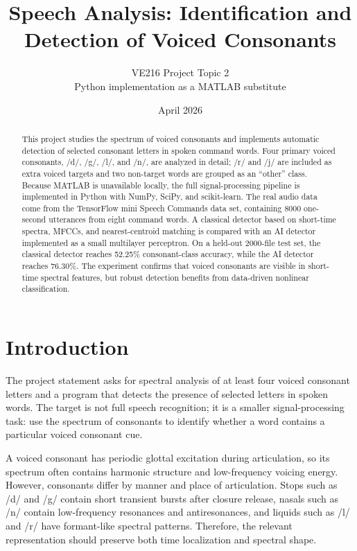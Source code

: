 \documentclass[11pt]{article}
\title{Speech Analysis: Identification and Detection of Voiced Consonants}
\author{VE216 Project Topic 2\\Python implementation as a MATLAB substitute}
\date{April 2026}
\begin{document}
\maketitle

\begin{abstract}
This project studies the spectrum of voiced consonants and implements automatic detection of selected consonant letters in spoken command words.  Four primary voiced consonants, /d/, /g/, /l/, and /n/, are analyzed in detail; /r/ and /j/ are included as extra voiced targets and two non-target words are grouped as an ``other'' class.  Because MATLAB is unavailable locally, the full signal-processing pipeline is implemented in Python with NumPy, SciPy, and scikit-learn.  The real audio data come from the TensorFlow mini Speech Commands data set, containing 8000 one-second utterances from eight command words.  A classical detector based on short-time spectra, MFCCs, and nearest-centroid matching is compared with an AI detector implemented as a small multilayer perceptron.  On a held-out 2000-file test set, the classical detector reaches 52.25\% consonant-class accuracy, while the AI detector reaches 76.30\%.  The experiment confirms that voiced consonants are visible in short-time spectral features, but robust detection benefits from data-driven nonlinear classification.
\end{abstract}

\section{Introduction}

The project statement asks for spectral analysis of at least four voiced consonant letters and a program that detects the presence of selected letters in spoken words.  The target is not full speech recognition; it is a smaller signal-processing task: use the spectrum of consonants to identify whether a word contains a particular voiced consonant cue.

A voiced consonant has periodic glottal excitation during articulation, so its spectrum often contains harmonic structure and low-frequency voicing energy.  However, consonants differ by manner and place of articulation.  Stops such as /d/ and /g/ contain short transient bursts after closure release, nasals such as /n/ contain low-frequency resonances and antiresonances, and liquids such as /l/ and /r/ have formant-like spectral patterns.  Therefore, the relevant representation should preserve both time localization and spectral shape.
\end{document}

